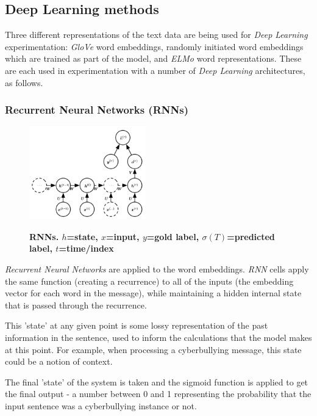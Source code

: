 \documentclass[12pt,a4paper]{article}
\begin{document}
\subsection{Deep Learning methods}
Three different representations of the text data are being used for \textit{Deep Learning} experimentation: \textit{GloVe} word embeddings, randomly initiated word embeddings which are trained as part of the model, and \textit{ELMo} word representations. These are each used in experimentation with a number of \textit{Deep Learning} architectures, as follows.

	\subsubsection{Recurrent Neural Networks (RNNs)}
	
	\begin{figure}
		\vspace{-40pt}
		\includegraphics[width=0.45\textwidth]{RNN.png}
		\vspace{-2pt}
		\label{RNN}
		\caption{\textbf{RNNs. $h$=state, $x$=input, $y$=gold label, $\sigma(T)$=predicted label, $t$=time/index}}
	\end{figure}
	
	\textit{Recurrent Neural Networks} are applied to the word embeddings. \textit{RNN} cells apply the same function (creating a recurrence) to all of the inputs (the embedding vector for each word in the message), while maintaining a hidden internal state that is passed through the recurrence. \cite[p.376]{DL}
	
	This 'state' at any given point is some lossy representation of the past information in the sentence, used to inform the calculations that the model makes at this point. For example, when processing a cyberbullying message, this state could be a notion of context.
	
	The final 'state' of the system is taken and the sigmoid function is applied to get the final output - a number between 0 and 1 representing the probability that the input sentence was a cyberbullying instance or not.
	
\end{document}
